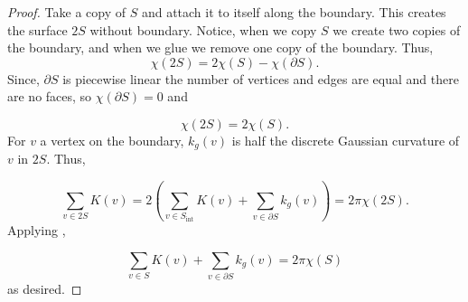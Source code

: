 \begin{proof}
Take a copy of $S$ and attach it to itself along the boundary.
This creates the surface $2S$ without boundary. Notice,
when we copy $S$ we create two copies of the boundary, and when
we glue we remove one copy of the boundary.
Thus, $$\chi(2S)=2\chi(S)-\chi(\partial S).$$
Since, $\partial S$ is piecewise linear the number of vertices and
edges are equal and there are no faces, so $\chi(\partial S)=0$
and 

\begin{equation} \label{eqn:glue}
\chi(2S)=2\chi(S).
\end{equation}
For $v$ a vertex on the boundary, $k_g(v)$ is half
the discrete Gaussian curvature of $v$ in $2S.$
Thus,

$$\sum_{v\in 2S}K(v)=2\left(\sum_{v\in S_{\text{int}}}K(v)+\sum_{v\in \partial S} k_g(v)\right) =2\pi  \chi(2S).$$
Applying ,

$$\sum_{v\in S}K(v)+\sum_{v\in \partial S} k_g(v)=2\pi  \chi(S)$$
as desired.

\end{proof}